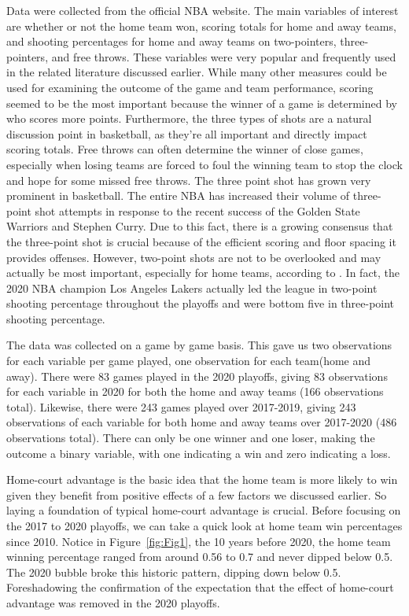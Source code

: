 \documentclass[10pt]{article}
\begin{document}
Data were collected from the official NBA website. The main variables of interest
are whether or not the home team won, scoring totals for home and away teams, and
shooting percentages for home and away teams on two-pointers, three-pointers, and
free throws. These variables were very popular and frequently used in the related
literature discussed earlier. While many other measures could be used for examining
the outcome of the game and team performance, scoring seemed to be the most
important because the winner of a game is determined by who scores more points. Furthermore, 
the three types of shots are a
natural discussion point in basketball, as they're all
important and directly impact scoring totals. Free throws can often determine the winner of close
games, especially when losing teams are forced to foul the winning team to
stop the clock and hope for some missed free throws. The three
point shot has grown very prominent in basketball. The entire NBA has increased their
volume of three-point shot attempts in response to the
recent success of the Golden State Warriors and Stephen Curry. Due to this
fact, there is a growing consensus that the three-point shot is crucial because of 
the efficient scoring and floor spacing it provides offenses. 
However, two-point shots are not to be overlooked and may
actually be most important, especially for home teams, according
to \citet{Harris}. In fact, the 2020 NBA champion Los Angeles Lakers actually led the 
league in two-point shooting percentage throughout the playoffs and were bottom five
in three-point shooting percentage.

The data was collected on a game by game basis. This gave us two observations
for each variable per game played, one observation for each team(home and away).
There were 83 games played in the 2020 playoffs, giving 83 observations
for each variable in 2020 for both the home and away teams (166 observations total).
Likewise, there were 243 games played over 2017-2019, giving 243 observations of each variable
for both home and away teams over 2017-2020 (486 observations total).
 There can only be
one winner and one loser, making the outcome a binary variable, with
one indicating a win and zero indicating a loss.

Home-court advantage is the basic idea that the home team is more likely to win given 
they benefit from positive effects of a few factors we discussed earlier.
So laying a foundation of typical home-court advantage is crucial. Before
focusing on the 2017 to 2020 playoffs, we can take a quick look at home team win
percentages since 2010. Notice in Figure~\ref{fig:Fig1}, the 10 years before 2020, the home team
winning percentage ranged from around 0.56 to 0.7 and never dipped below 0.5. The
2020 bubble broke this historic pattern, dipping down below 0.5. Foreshadowing
the confirmation of the expectation that the effect of home-court advantage was removed
in the 2020 playoffs.
\end{document}
